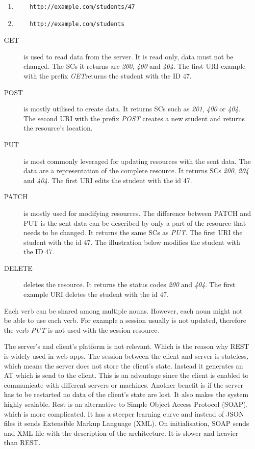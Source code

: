 	\begin{enumerate}
	\item 
	\lstset{style=sharpc}
	\begin{lstlisting}
	http://example.com/students/47
	\end{lstlisting}
	
	\item 
	\lstset{style=sharpc}
	\begin{lstlisting}
	http://example.com/students
	\end{lstlisting}
	\end{enumerate}
	
	\begin {description}
	\item [GET] is used to read data from the server. It is read only, data must not be changed. The SCs it returns are \textit{200}, \textit{400} and \textit{404}. The first URI example with the prefix \textit{GET}returns the student with the ID 47.
	\item [POST] is mostly utilised to create data. It returns SCs such as \textit{201}, \textit{400} or \textit{404}. The second URI with the prefix \textit{POST} creates a new student and returns the resource's location.		
	\item [PUT] is most commonly leveraged for updating resources with the sent data. The data are a representation of the complete resource. It returns SCs \textit{200}, \textit{204} and \textit{404}. The first URI edits the student with the id 47.
	\item [PATCH] is mostly used for modifying resources. The difference between PATCH and PUT is the sent data can be described by only a part of the resource that needs to be changed. It returns the same SCs as \textit{PUT}. The first URI the student with the id 47. The illustration below modifies the student with the ID 47.
	\item [DELETE] deletes the resource. It returns the status codes \textit{200} and \textit{404}. The first example URI deletes the student with the id 47.
	\end{description}
	Each verb can be shared among multiple nouns. However, each noun might not be able to use each verb. For example a session usually is not updated, therefore the verb \textit{PUT} is not used with the session resource.
	
	The server's and client's platform is not relevant. Which is the reason why REST is widely used in web apps. The session between the client and server is stateless, which means the server does not store the client's state. Instead it generates an AT which is send to the client. This is an advantage since the client is enabled to communicate with different servers or machines. Another benefit is if the server has to be restarted no data of the client's state are lost. It also makes the system highly scalable. Rest is an alternative to Simple Object Access Protocol (SOAP), which is more complicated. It has a steeper learning curve and instead of JSON files it sends Extensible Markup Language (XML). On initialisation, SOAP sends and XML file with the description of the architecture. It is slower and heavier than REST. 

